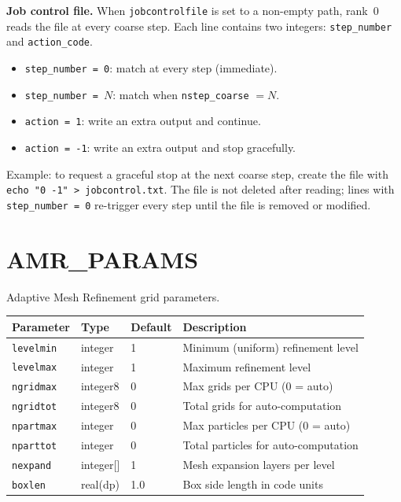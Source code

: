 \documentclass[11pt,fleqn]{book}
\begin{document}
\noindent
\textbf{Job control file.}\quad
When \texttt{jobcontrolfile} is set to a non-empty path, rank~0 reads the file
at every coarse step.  Each line contains two integers: \texttt{step\_number}
and \texttt{action\_code}.
\begin{itemize}[nosep]
  \item \texttt{step\_number = 0}: match at every step (immediate).
  \item \texttt{step\_number = $N$}: match when \texttt{nstep\_coarse} $= N$.
  \item \texttt{action = 1}: write an extra output and continue.
  \item \texttt{action = -1}: write an extra output and stop gracefully.
\end{itemize}
Example: to request a graceful stop at the next coarse step, create the file
with \texttt{echo "0 -1" > jobcontrol.txt}.  The file is not deleted after
reading; lines with \texttt{step\_number = 0} re-trigger every step until
the file is removed or modified.


\chapter{AMR\_PARAMS}

Adaptive Mesh Refinement grid parameters.

\begin{longtable}{L{3.5cm} C{1.8cm} C{1.8cm} L{6cm}}
\toprule
\textbf{Parameter} & \textbf{Type} & \textbf{Default} & \textbf{Description} \\
\midrule
\endhead
\texttt{levelmin} & integer & 1 & Minimum (uniform) refinement level \\
\texttt{levelmax} & integer & 1 & Maximum refinement level \\
\texttt{ngridmax} & integer8 & 0 & Max grids per CPU (0 = auto) \\
\texttt{ngridtot} & integer8 & 0 & Total grids for auto-computation \\
\texttt{npartmax} & integer & 0 & Max particles per CPU (0 = auto) \\
\texttt{nparttot} & integer & 0 & Total particles for auto-computation \\
\texttt{nexpand} & integer[] & 1 & Mesh expansion layers per level \\
\texttt{boxlen} & real(dp) & 1.0 & Box side length in code units \\
\bottomrule
\end{longtable}
\end{document}
